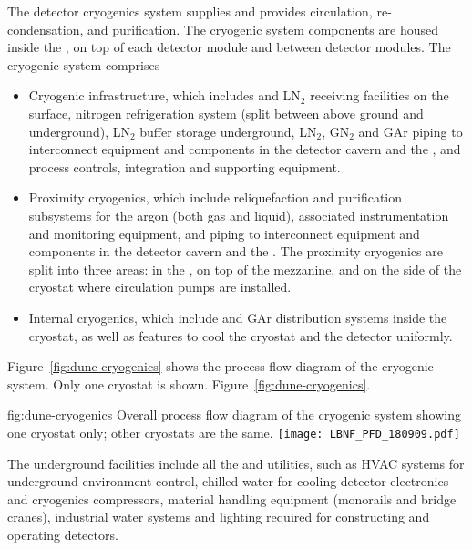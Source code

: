 The detector cryogenics system supplies  and provides
circulation, re-condensation, and purification. The cryogenic system
components are housed inside the , on top of each detector module
and between detector modules. The cryogenic system comprises
\begin{itemize}
\item Cryogenic infrastructure, which includes  and LN$_2$ receiving
  facilities on the surface, nitrogen refrigeration system (split
  between above ground and underground), LN$_2$ buffer storage
  underground, LN$_2$, GN$_2$ and GAr piping to interconnect equipment and
  components in the detector cavern and the , and process controls,
  integration and supporting equipment. 
\item Proximity cryogenics, which include reliquefaction  and
  purification subsystems for the argon (both gas and liquid), associated
  instrumentation and monitoring equipment, and  piping to
  interconnect equipment and components in the detector cavern and the
  . The proximity cryogenics are split into three areas: in the
  , on top of the mezzanine, and on the side of the cryostat 
  where  circulation pumps are installed.
\item Internal cryogenics, which include  and GAr distribution
  systems inside the cryostat, as well as features to cool the
  cryostat and the detector uniformly.
\end{itemize}
Figure~\ref{fig:dune-cryogenics} shows the process flow diagram of the
 cryogenic system. Only one cryostat is shown.
Figure~\ref{fig:dune-cryogenics}.
\begin{dunefigure}{fig:dune-cryogenics}
  {Overall process flow diagram of the cryogenic system showing one
    cryostat only; other cryostats are the same.}
  \texttt{[image: LBNF\_PFD\_180909.pdf]}
\end{dunefigure}


The underground facilities include all the  
and utilities, such as HVAC systems for
underground environment control, chilled water for cooling detector
electronics and cryogenics compressors, material handling equipment
(monorails and bridge cranes), industrial water systems and lighting required for constructing and operating detectors.


